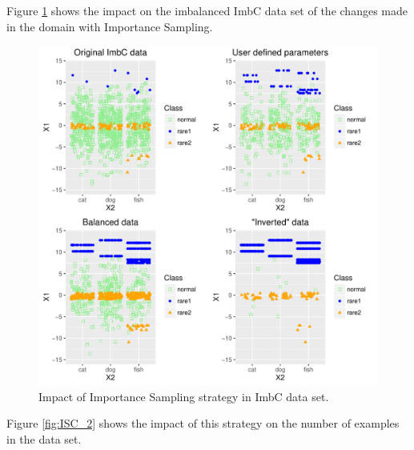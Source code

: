 \documentclass[10pt,a4paper]{article}\usepackage[]{graphicx}\usepackage[]{color}
\makeatletter
\def\maxwidth{ %
  \ifdim\Gin@nat@width>\linewidth
    \linewidth
  \else
    \Gin@nat@width
  \fi
}
\newenvironment{knitrout}{}{} %
\makeatother
\begin{document}
Figure \ref{fig:ISC} shows the impact on the imbalanced ImbC data set of the changes made in the domain with Importance Sampling.

\begin{knitrout}\footnotesize
{}\color{fgcolor}\begin{figure}

{\centering \includegraphics[width=\maxwidth]{figures/UBL-ISC-1} 

}

\caption[Impact of Importance Sampling strategy in ImbC data set]{Impact of Importance Sampling strategy in ImbC data set.}\label{fig:ISC}
\end{figure}


\end{knitrout}



Figure \ref{fig:ISC_2} shows the impact of this strategy on the number of examples in the data set.
\end{document}
